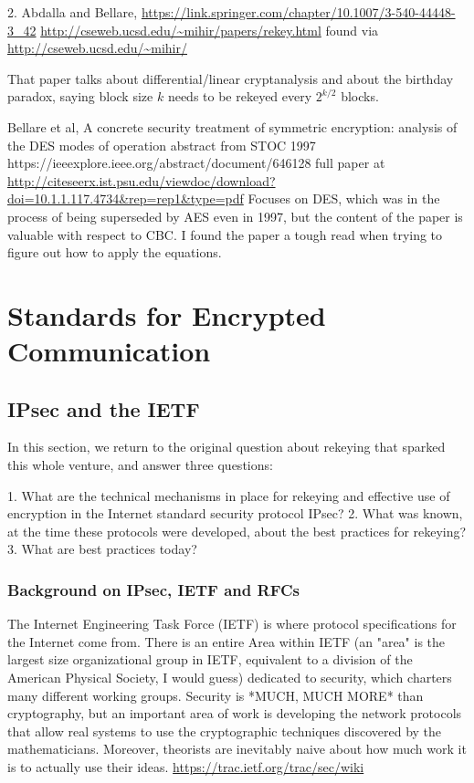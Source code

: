 \documentclass[%
 aip,
 jmp,%
 amsmath,amssymb,
 reprint,%
]{revtex4-1}
\begin{document}
2. Abdalla and Bellare,
\url{https://link.springer.com/chapter/10.1007/3-540-44448-3_42}
\url{http://cseweb.ucsd.edu/~mihir/papers/rekey.html}
found via
\url{http://cseweb.ucsd.edu/~mihir/}

That paper talks about differential/linear cryptanalysis and about the
birthday paradox, saying block size $k$ needs to be rekeyed every
$2^{k/2}$ blocks.

Bellare et al, A concrete security treatment of symmetric encryption:
analysis of the DES modes of operation
abstract from STOC 1997
https://ieeexplore.ieee.org/abstract/document/646128
full paper at
\url{http://citeseerx.ist.psu.edu/viewdoc/download?doi=10.1.1.117.4734&rep=rep1&type=pdf}
Focuses on DES, which was in the process of being superseded by AES
even in 1997, but the content of the paper is valuable with respect to
CBC.  I found the paper a tough read when trying to figure out how to
apply the equations.

\section{Standards for Encrypted Communication}

\subsection{IPsec and the IETF}

In this section, we return to the original question about rekeying
that sparked this whole venture, and answer three questions:

1. What are the technical mechanisms in place for rekeying and
   effective use of encryption in the Internet standard security
   protocol IPsec?
2. What was known, at the time these protocols were developed, about
   the best practices for rekeying?
3. What are best practices today?

\subsubsection{Background on IPsec, IETF and RFCs}

The Internet Engineering Task Force (IETF) is where protocol
specifications for the Internet come from.  There is an entire Area
within IETF (an "area" is the largest size organizational group in
IETF, equivalent to a division of the American Physical Society, I
would guess) dedicated to security, which charters many different
working groups.  Security is *MUCH, MUCH MORE* than cryptography, but
an important area of work is developing the network protocols that
allow real systems to use the cryptographic techniques discovered by
the mathematicians.  Moreover, theorists are inevitably naive about
how much work it is to actually use their ideas.
\url{https://trac.ietf.org/trac/sec/wiki}
\end{document}

